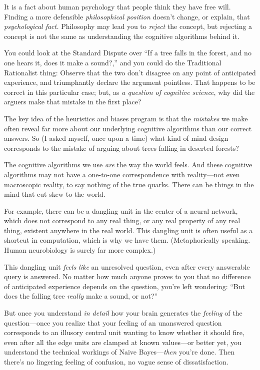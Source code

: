 {
 It is a fact about human psychology that people think they have
free will. Finding a more defensible \textit{philosophical position}
doesn't change, or explain, that \textit{psychological
fact.} Philosophy may lead you to \textit{reject} the concept, but
rejecting a concept is not the same as understanding the cognitive
algorithms behind it.}

{
 You could look at the Standard Dispute over ``If
a tree falls in the forest, and no one hears it, does it make a
sound?,'' and you could do the Traditional
Rationalist thing: Observe that the two don't disagree
on any point of anticipated experience, and triumphantly declare the
argument pointless. That happens to be correct in this particular case;
but, as \textit{a question of cognitive science}, why did the arguers
make that mistake in the first place?}

{
 The key idea of the heuristics and biases program is that the
\textit{mistakes} we make often reveal far more about our underlying
cognitive algorithms than our correct answers. So (I asked myself, once
upon a time) what kind of mind design corresponds to the mistake of
arguing about trees falling in deserted forests?}

{
 The cognitive algorithms we use \textit{are} the way the world
feels. And these cognitive algorithms may not have a one-to-one
correspondence with reality---not even macroscopic reality, to say
nothing of the true quarks. There can be things in the mind that cut
skew to the world.}

{
 For example, there can be a dangling unit in the center of a
neural network, which does not correspond to any real thing, or any
real property of any real thing, existent anywhere in the real world.
This dangling unit is often useful as a shortcut in computation, which
is why we have them. (Metaphorically speaking. Human neurobiology is
surely far more complex.)}

{
 This dangling unit \textit{feels like} an unresolved question,
even after every answerable query is answered. No matter how much
anyone proves to you that no difference of anticipated experience
depends on the question, you're left wondering:
``But does the falling tree \textit{really} make a
sound, or not?''}

{
 But once you understand \textit{in detail} how your brain
generates the \textit{feeling} of the question---once you realize that
your feeling of an unanswered question corresponds to an illusory
central unit wanting to know whether it should fire, even after all the
edge units are clamped at known values---or better yet, you understand
the technical workings of Naive Bayes---\textit{then}
you're done. Then there's no lingering
feeling of confusion, no vague sense of dissatisfaction.}

